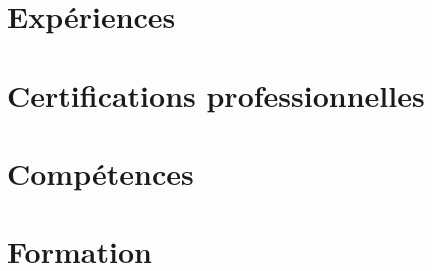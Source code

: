 \documentclass[10pt, letterpaper]{article}
\begin{document}






\section*{Expériences}


\section*{Certifications professionnelles}


\section*{Compétences}


\section*{Formation}

\end{document}
